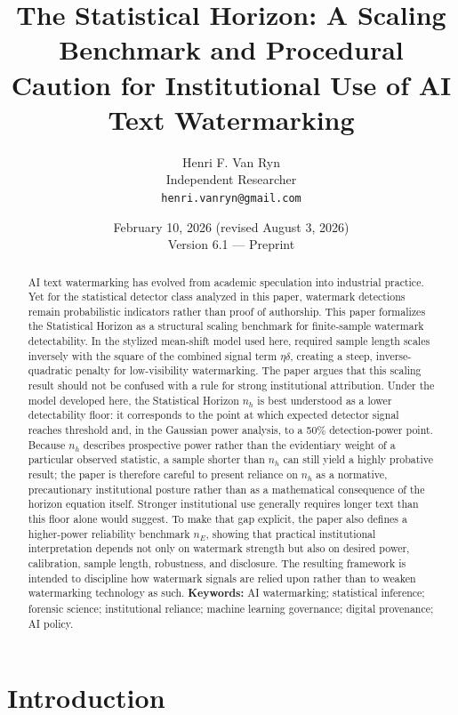 \documentclass[11pt]{article}
\title{The Statistical Horizon: A Scaling Benchmark and Procedural
Caution for Institutional Use of AI Text Watermarking}
\author{Henri F. Van Ryn\\
Independent Researcher\\
\texttt{henri.vanryn@gmail.com}}
\date{February 10, 2026 (revised August 3, 2026)\\Version 6.1 --- Preprint}
\begin{document}
\maketitle
\begin{abstract}
AI text watermarking has evolved from academic speculation into industrial
practice. Yet for the statistical detector class analyzed in this paper, watermark
detections remain probabilistic indicators rather than proof of authorship. This
paper formalizes the Statistical Horizon as a structural scaling benchmark for
finite-sample watermark detectability. In the stylized mean-shift model used here,
required sample length scales inversely with the square of the combined signal
term $\eta\delta$, creating a steep, inverse-quadratic penalty for low-visibility
watermarking.
The paper argues that this scaling result should not be confused with a rule for
strong institutional attribution. Under the model developed here, the Statistical
Horizon $n_h$ is best understood as a lower detectability floor: it corresponds to
the point at which expected detector signal reaches threshold and, in the Gaussian
power analysis, to a 50\% detection-power point. Because $n_h$ describes
prospective power rather than the evidentiary weight of a particular observed
statistic, a sample shorter than $n_h$ can still yield a highly probative result;
the paper is therefore careful to present reliance on $n_h$ as a normative,
precautionary institutional posture rather than as a mathematical consequence of
the horizon equation itself. Stronger institutional use generally requires longer
text than this floor alone would suggest. To make that gap explicit, the paper
also defines a higher-power reliability benchmark $n_E$, showing that practical
institutional interpretation depends not only on watermark strength but also on
desired power, calibration, sample length, robustness, and disclosure. The
resulting framework is intended to discipline how watermark signals are relied
upon rather than to weaken watermarking technology as such.
\medskip
\noindent\textbf{Keywords:} AI watermarking; statistical inference; forensic
science; institutional reliance; machine learning governance; digital provenance;
AI policy.
\end{abstract}
\section{Introduction}
\end{document}
